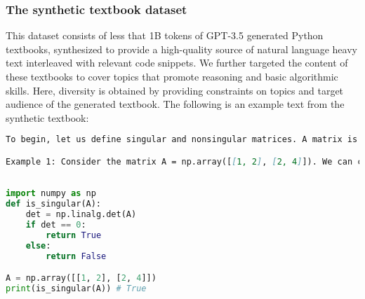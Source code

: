 \subsubsection*{The synthetic textbook dataset}
This dataset consists of less that 1B tokens of GPT-3.5 generated Python textbooks, synthesized to provide a high-quality source of natural language heavy text interleaved with relevant code snippets. We further targeted the content of these textbooks to cover topics that promote reasoning and basic algorithmic skills. Here, diversity is obtained by providing constraints on topics and target audience of the generated textbook.  The following is an example text from the synthetic textbook:
\begin{AIbox}{}
\begin{lstlisting}[language=markdown]
To begin, let us define singular and nonsingular matrices. A matrix is said to be singular if its  determinant is zero. On the other hand, a matrix is said to be nonsingular if its determinant is not zero. Now, let's explore these concepts through examples.

Example 1: Consider the matrix A = np.array([[1, 2], [2, 4]]). We can check if this matrix is singular or nonsingular using the determinant function. We can define a Python function, `is_singular(A)`, which  returns true if the determinant of A is zero, and false otherwise.
\end{lstlisting}\vspace{-1em}
\begin{lstlisting}[language=Python, style=mystyle]

import numpy as np
def is_singular(A):
    det = np.linalg.det(A)
    if det == 0:
        return True
    else:
        return False

A = np.array([[1, 2], [2, 4]])
print(is_singular(A)) # True
\end{lstlisting}

\end{AIbox}
\begin{comment}
\begin{verbatim}
# Chapter: The use of Python Libraries/Modules for Market Research Analyst
...
### Subsection 2: Formatting Currency
Currency is a significant aspect in market research, and it is essential to format it correctly for analysis. Python provides the `locale` module for formatting currency. This module contains functions that enable us to format currency based on location.

```Python
import locale
# setting the locale to the United States
locale.setlocale(locale.LC_ALL, 'en_US.UTF-8')
# formatting currency
formatted_currency = locale.currency(12345.67)
print(formatted_currency)
...
\end{verbatim}
\end{comment}

